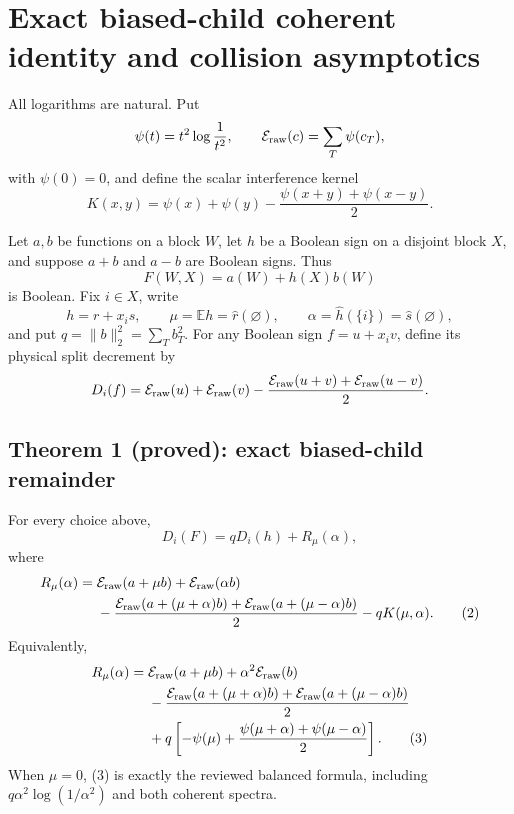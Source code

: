 \section*{Exact biased-child coherent identity and collision asymptotics}

All logarithms are natural.  Put
\[
 \psi(t)=t^2\log\frac1{t^2},\qquad
 \mathcal E_{\rm raw}(c)=\sum_T\psi(c_T),
\]
with \(\psi(0)=0\), and define the scalar interference kernel
\[
 K(x,y)=\psi(x)+\psi(y)-\frac{\psi(x+y)+\psi(x-y)}2.
\]

Let \(a,b\) be functions on a block \(W\), let \(h\) be a Boolean sign
on a disjoint block \(X\), and suppose \(a+b\) and \(a-b\) are Boolean
signs.  Thus
\[
 F(W,X)=a(W)+h(X)b(W)
\]
is Boolean.  Fix \(i\in X\), write
\[
 h=r+x_i s,\qquad \mu=\mathbb Eh=\widehat r(\varnothing),
 \qquad \alpha=\widehat h(\{i\})=\widehat s(\varnothing),
\]
and put \(q=\|b\|_2^2=\sum_T b_T^2\).  For any Boolean sign
\(f=u+x_i v\), define its physical split decrement by
\[
 D_i(f)=\mathcal E_{\rm raw}(u)+\mathcal E_{\rm raw}(v)
 -\frac{\mathcal E_{\rm raw}(u+v)+\mathcal E_{\rm raw}(u-v)}2.
\]

\subsection*{Theorem 1 (proved): exact biased-child remainder}

For every choice above,
\[
 D_i(F)=qD_i(h)+R_\mu(\alpha),                                      \tag{1}
\]
where
\begin{align*}
 R_\mu(\alpha)={}&\mathcal E_{\rm raw}(a+\mu b)
 +\mathcal E_{\rm raw}(\alpha b)\\
 &-\frac{\mathcal E_{\rm raw}(a+(\mu+\alpha)b)
              +\mathcal E_{\rm raw}(a+(\mu-\alpha)b)}2
 -qK(\mu,\alpha).                                                   \tag{2}
\end{align*}
Equivalently,
\begin{align*}
 R_\mu(\alpha)={}&\mathcal E_{\rm raw}(a+\mu b)
 +\alpha^2\mathcal E_{\rm raw}(b)\\
 &-\frac{\mathcal E_{\rm raw}(a+(\mu+\alpha)b)
              +\mathcal E_{\rm raw}(a+(\mu-\alpha)b)}2\\
 &+q\left[-\psi(\mu)+\frac{\psi(\mu+\alpha)+\psi(\mu-\alpha)}2\right]. \tag{3}
\end{align*}
When \(\mu=0\), (3) is exactly the reviewed balanced formula, including
\(q\alpha^2\log(1/\alpha^2)\) and both coherent spectra.

